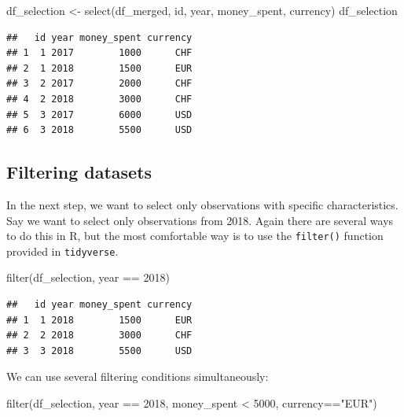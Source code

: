 \documentclass[
  12pt,
]{style/krantz}
\newenvironment{Shaded}{\begin{snugshade}}{\end{snugshade}}
\newcommand{\DecValTok}[1]{\textcolor[rgb]{0.00,0.00,0.81}{#1}}
\newcommand{\FunctionTok}[1]{\textcolor[rgb]{0.00,0.00,0.00}{#1}}
\newcommand{\NormalTok}[1]{#1}
\newcommand{\OtherTok}[1]{\textcolor[rgb]{0.56,0.35,0.01}{#1}}
\newcommand{\SpecialCharTok}[1]{\textcolor[rgb]{0.00,0.00,0.00}{#1}}
\newcommand{\StringTok}[1]{\textcolor[rgb]{0.31,0.60,0.02}{#1}}
\begin{document}
\begin{Shaded}
\begin{Highlighting}[]
\NormalTok{df\_selection }\OtherTok{\textless{}{-}} \FunctionTok{select}\NormalTok{(df\_merged, id, year, money\_spent, currency)}
\NormalTok{df\_selection}
\end{Highlighting}
\end{Shaded}

\begin{verbatim}
##   id year money_spent currency
## 1  1 2017        1000      CHF
## 2  1 2018        1500      EUR
## 3  2 2017        2000      CHF
## 4  2 2018        3000      CHF
## 5  3 2017        6000      USD
## 6  3 2018        5500      USD
\end{verbatim}

\hypertarget{filtering-datasets}{%
\subsection{Filtering datasets}\label{filtering-datasets}}

In the next step, we want to select only observations with specific characteristics. Say we want to select only observations from 2018. Again there are several ways to do this in R, but the most comfortable way is to use the \texttt{filter()} function provided in \texttt{tidyverse}.

\begin{Shaded}
\begin{Highlighting}[]
\FunctionTok{filter}\NormalTok{(df\_selection, year }\SpecialCharTok{==} \DecValTok{2018}\NormalTok{)}
\end{Highlighting}
\end{Shaded}

\begin{verbatim}
##   id year money_spent currency
## 1  1 2018        1500      EUR
## 2  2 2018        3000      CHF
## 3  3 2018        5500      USD
\end{verbatim}

We can use several filtering conditions simultaneously:

\begin{Shaded}
\begin{Highlighting}[]
\FunctionTok{filter}\NormalTok{(df\_selection, year }\SpecialCharTok{==} \DecValTok{2018}\NormalTok{, money\_spent }\SpecialCharTok{\textless{}} \DecValTok{5000}\NormalTok{, currency}\SpecialCharTok{==}\StringTok{"EUR"}\NormalTok{)}
\end{Highlighting}
\end{Shaded}
\end{document}
